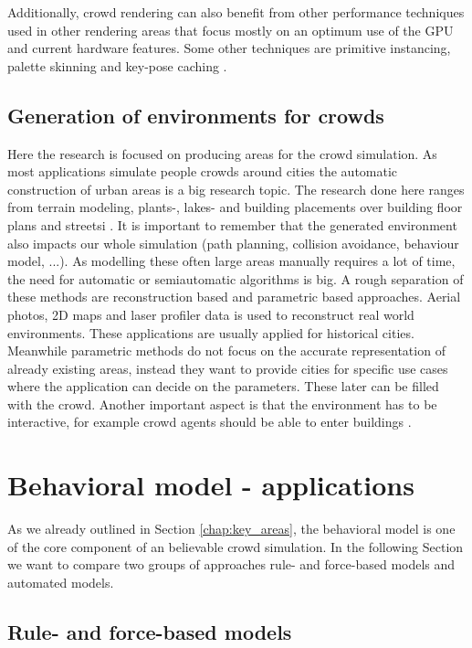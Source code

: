 \documentclass{acmsiggraph}               %
\begin{document}
Additionally, crowd rendering can also benefit from other performance techniques used in other rendering areas that focus mostly on an optimum use of the GPU and current hardware features. Some other techniques are primitive instancing, palette skinning and key-pose caching \cite{beacco_survey_2016}.

\subsection{Generation of environments for crowds}

Here the research is focused on producing areas for the crowd simulation. As most applications simulate people crowds around cities the automatic construction of urban areas is a big research topic. The research done here ranges from terrain modeling, plants-, lakes- and building placements over building floor plans and streetsi \cite{berg_computational_2000}. It is important to remember that the generated environment also impacts our whole simulation (path planning, collision avoidance, behaviour model, ...). 
As modelling these often large areas manually requires a lot of time, the need for automatic or semiautomatic algorithms is big. A rough separation of these methods are reconstruction based and parametric based approaches. 
Aerial photos, 2D maps and laser profiler data is used to reconstruct real world environments. These applications are usually applied for historical cities. 
Meanwhile parametric methods do not focus on the accurate representation of already existing areas, instead they want to provide cities for specific use cases where the application can decide on the parameters. These later can be filled with the crowd. Another important aspect is that the environment has to be interactive, for example  crowd agents should be able to enter buildings
\cite{thalmann_crowd_2013}.

\section{Behavioral model - applications}

As we already outlined in Section \ref{chap:key_areas}, the behavioral model is one of the core component of an believable crowd simulation. In the following Section we want to compare two groups of approaches rule- and force-based models and automated models.

\subsection{Rule- and force-based models}
\end{document}
